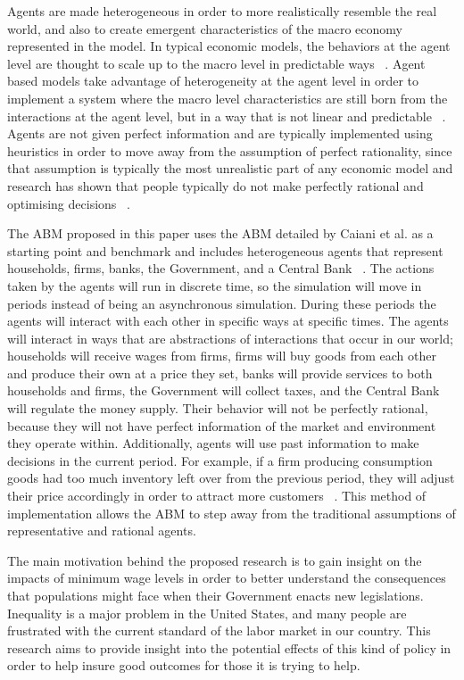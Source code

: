 \documentclass[11pt]{article}
\begin{document}
Agents are made heterogeneous in order to more realistically resemble the real
world, and also to create emergent characteristics of the macro economy represented
 in the model. In typical economic models, the behaviors at the agent level are
 thought to scale up to the macro level in predictable ways ~\cite{Haldane-history-paper}.
 Agent based models take advantage of heterogeneity at the agent level in order
 to implement a system where the macro level characteristics are still born
 from the interactions at the agent level, but in a way that is not linear and
 predictable ~\cite{Haldane-history-paper}. Agents are not given perfect information
 and are typically implemented using heuristics in order to move away from the
  assumption of perfect rationality, since that assumption is typically the most
  unrealistic part of any economic model and research has shown that people
   typically do not make perfectly rational and optimising decisions ~\cite{Haldane-history-paper}.

The ABM proposed in this paper uses the ABM detailed by Caiani et al. as a
starting point and benchmark and includes heterogeneous agents that represent
households, firms, banks, the Government, and a Central Bank  ~\cite{Caiani-benchmark-paper}.
The actions taken by the agents will run in discrete time, so the simulation will
move in periods instead of being an asynchronous simulation. During these periods
the agents will interact with each other in specific ways at specific times.
 The agents will interact in ways that are abstractions of interactions that
 occur in our world; households will receive wages from firms, firms will buy
 goods from each other and produce their own at a price they set, banks will
 provide services to both households and firms, the Government will collect taxes,
 and the Central Bank will regulate the money supply. Their behavior will not be
  perfectly rational, because they will not have perfect information of the market
 and environment they operate within. Additionally, agents will use past information
   to make decisions in the current period. For example, if a firm producing consumption
goods had too much inventory left over from the previous period, they will
adjust their price accordingly in order to attract more customers ~\cite{Caiani-benchmark-paper}.
This method of implementation allows the ABM to step away from the traditional
  assumptions of representative and rational agents.

The main motivation behind the proposed research is to gain insight on the
impacts of minimum wage levels in order to better understand the consequences
 that populations might face when their Government enacts new legislations.
 Inequality is a major problem in the United States, and many people are frustrated
 with the current standard of the labor market in our country. This research aims
 to provide insight into the potential effects of this kind of policy in order to
  help insure good outcomes for those it is trying to help.
\end{document}

